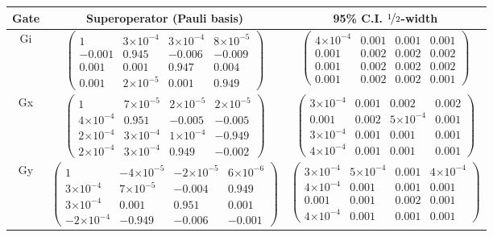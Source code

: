\documentclass{article}[11pt]
\providecommand{\e}[1]{\ensuremath{\times 10^{#1}}}
\begin{document}
\begin{table}[h]
\begin{center}
\begin{tabular}[l]{|c|c|c|}
\hline
Gate & Superoperator (Pauli basis) & 95\% C.I. $\nicefrac{1}{2}$-width \\ \hline
Gi & $ \left(\!\!\begin{array}{cccc}
1 & 3\e{-4} & 3\e{-4} & 8\e{-5} \\ 
-0.001 & 0.945 & -0.006 & -0.009 \\ 
0.001 & 0.001 & 0.947 & 0.004 \\ 
0.001 & 2\e{-5} & 0.001 & 0.949
 \end{array}\!\!\right) $
 & $ \left(\!\!\begin{array}{cccc}
4\e{-4} & 0.001 & 0.001 & 0.001 \\ 
0.001 & 0.002 & 0.002 & 0.002 \\ 
0.001 & 0.002 & 0.002 & 0.002 \\ 
0.001 & 0.002 & 0.002 & 0.001
 \end{array}\!\!\right) $
 \\ \hline
Gx & $ \left(\!\!\begin{array}{cccc}
1 & 7\e{-5} & 2\e{-5} & 2\e{-5} \\ 
4\e{-4} & 0.951 & -0.005 & -0.005 \\ 
2\e{-4} & 3\e{-4} & 1\e{-4} & -0.949 \\ 
2\e{-4} & 3\e{-4} & 0.949 & -0.002
 \end{array}\!\!\right) $
 & $ \left(\!\!\begin{array}{cccc}
3\e{-4} & 0.001 & 0.002 & 0.002 \\ 
0.001 & 0.002 & 5\e{-4} & 0.001 \\ 
3\e{-4} & 0.001 & 0.001 & 0.001 \\ 
4\e{-4} & 0.001 & 0.001 & 0.001
 \end{array}\!\!\right) $
 \\ \hline
Gy & $ \left(\!\!\begin{array}{cccc}
1 & -4\e{-5} & -2\e{-5} & 6\e{-6} \\ 
3\e{-4} & 7\e{-5} & -0.004 & 0.949 \\ 
3\e{-4} & 0.001 & 0.951 & 0.001 \\ 
-2\e{-4} & -0.949 & -0.006 & -0.001
 \end{array}\!\!\right) $
 & $ \left(\!\!\begin{array}{cccc}
3\e{-4} & 5\e{-4} & 0.001 & 4\e{-4} \\ 
4\e{-4} & 0.001 & 0.001 & 0.001 \\ 
0.001 & 0.001 & 0.002 & 0.001 \\ 
4\e{-4} & 0.001 & 0.001 & 0.001
 \end{array}\!\!\right) $
 \\ \hline
\end{tabular}


\end{center}
\end{table}
\end{document}

